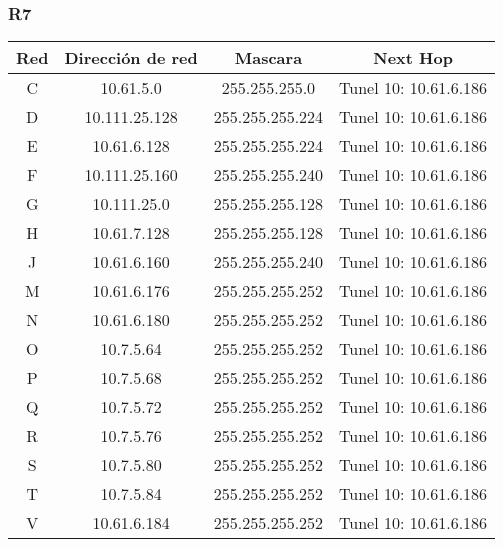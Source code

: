 \subsubsection{R7}
\begin{table}[!htbp]
\centering
  \begin{tabular}{|c|c|c|c|}
    \hline
	Red & Dirección de red & Mascara & Next Hop\\ \hline
	C & 10.61.5.0 & 255.255.255.0 & Tunel 10: 10.61.6.186 \\ \hline
	D & 10.111.25.128 & 255.255.255.224 & Tunel 10: 10.61.6.186 \\ \hline
	E & 10.61.6.128 & 255.255.255.224 & Tunel 10: 10.61.6.186 \\ \hline
	F & 10.111.25.160 & 255.255.255.240 & Tunel 10: 10.61.6.186 \\ \hline
	G & 10.111.25.0 & 255.255.255.128 & Tunel 10: 10.61.6.186 \\ \hline
	H & 10.61.7.128 & 255.255.255.128 & Tunel 10: 10.61.6.186 \\ \hline
	J & 10.61.6.160 & 255.255.255.240 & Tunel 10: 10.61.6.186 \\ \hline
	M & 10.61.6.176 & 255.255.255.252 & Tunel 10: 10.61.6.186 \\ \hline
	N & 10.61.6.180 & 255.255.255.252 & Tunel 10: 10.61.6.186 \\ \hline
	O & 10.7.5.64 & 255.255.255.252 & Tunel 10: 10.61.6.186 \\ \hline
	P & 10.7.5.68 & 255.255.255.252 & Tunel 10: 10.61.6.186 \\ \hline
	Q & 10.7.5.72 & 255.255.255.252 & Tunel 10: 10.61.6.186 \\ \hline
	R & 10.7.5.76 & 255.255.255.252 & Tunel 10: 10.61.6.186 \\ \hline
	S & 10.7.5.80 & 255.255.255.252 & Tunel 10: 10.61.6.186 \\ \hline
	T & 10.7.5.84 & 255.255.255.252 & Tunel 10: 10.61.6.186 \\ \hline
	V & 10.61.6.184 & 255.255.255.252 & Tunel 10: 10.61.6.186 \\
    \hline
  \end{tabular}
\end{table}

\newpage
